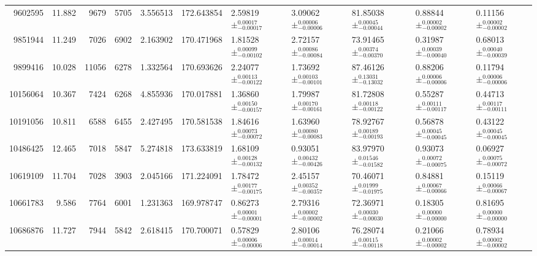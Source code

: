 \begin{sidewaystable*}
\begin{tabular}{rrrrrrlllll}
   9602595 &            11.882 &             9679 &             5705 &  3.556513 &  172.643854 &  2.59819$\pm_{-0.00017}^{0.00017}$ &  3.09062$\pm_{-0.00006}^{0.00006}$ &  81.85038$\pm_{-0.00044}^{0.00045}$ &  0.88844$\pm_{-0.00002}^{0.00002}$ &  0.11156$\pm_{-0.00002}^{0.00002}$ \\
   9851944 &            11.249 &             7026 &             6902 &  2.163902 &  170.471968 &  1.81528$\pm_{-0.00102}^{0.00099}$ &  2.72157$\pm_{-0.00084}^{0.00086}$ &  73.91465$\pm_{-0.00370}^{0.00374}$ &  0.31987$\pm_{-0.00040}^{0.00039}$ &  0.68013$\pm_{-0.00039}^{0.00040}$ \\
   9899416 &            10.028 &            11056 &             6278 &  1.332564 &  170.693626 &  2.24077$\pm_{-0.00122}^{0.00113}$ &  1.73692$\pm_{-0.00101}^{0.00103}$ &  87.46126$\pm_{-0.13032}^{0.13031}$ &  0.88206$\pm_{-0.00006}^{0.00006}$ &  0.11794$\pm_{-0.00006}^{0.00006}$ \\
  10156064 &            10.367 &             7424 &             6268 &  4.855936 &  170.017881 &  1.36860$\pm_{-0.00157}^{0.00150}$ &  1.79987$\pm_{-0.00161}^{0.00170}$ &  81.72808$\pm_{-0.00122}^{0.00118}$ &  0.55287$\pm_{-0.00117}^{0.00111}$ &  0.44713$\pm_{-0.00111}^{0.00117}$ \\
  10191056 &            10.811 &             6588 &             6455 &  2.427495 &  170.581538 &  1.84616$\pm_{-0.00072}^{0.00073}$ &  1.63960$\pm_{-0.00083}^{0.00080}$ &  78.92767$\pm_{-0.00193}^{0.00189}$ &  0.56878$\pm_{-0.00045}^{0.00045}$ &  0.43122$\pm_{-0.00045}^{0.00045}$ \\
  10486425 &            12.465 &             7018 &             5847 &  5.274818 &  173.633819 &  1.68109$\pm_{-0.00132}^{0.00128}$ &  0.93051$\pm_{-0.00426}^{0.00432}$ &  83.97970$\pm_{-0.01582}^{0.01546}$ &  0.93073$\pm_{-0.00075}^{0.00072}$ &  0.06927$\pm_{-0.00072}^{0.00075}$ \\
  10619109 &            11.704 &             7028 &             3903 &  2.045166 &  171.224091 &  1.78472$\pm_{-0.00175}^{0.00177}$ &  2.45157$\pm_{-0.00357}^{0.00352}$ &  70.46071$\pm_{-0.01975}^{0.01999}$ &  0.84881$\pm_{-0.00066}^{0.00067}$ &  0.15119$\pm_{-0.00067}^{0.00066}$ \\
  10661783 &             9.586 &             7764 &             6001 &  1.231363 &  169.978747 &  0.86273$\pm_{-0.00001}^{0.00001}$ &  2.79316$\pm_{-0.00002}^{0.00002}$ &  72.36971$\pm_{-0.00030}^{0.00030}$ &  0.18305$\pm_{-0.00000}^{0.00000}$ &  0.81695$\pm_{-0.00000}^{0.00000}$ \\
  10686876 &            11.727 &             7944 &             5842 &  2.618415 &  170.700071 &  0.57829$\pm_{-0.00006}^{0.00006}$ &  2.80106$\pm_{-0.00014}^{0.00014}$ &  76.28074$\pm_{-0.00118}^{0.00115}$ &  0.21066$\pm_{-0.00002}^{0.00002}$ &  0.78934$\pm_{-0.00002}^{0.00002}$ \\

\end{tabular}
\end{sidewaystable*}
